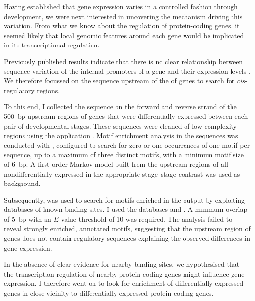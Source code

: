 Having established that \trna gene expression varies in a controlled fashion
through development, we were next interested in uncovering the mechanism driving
this variation. From what we know about the regulation of protein-coding genes,
it seemed likely that local genomic features around each \trna gene would be
implicated in its transcriptional regulation.

Previously published results indicate that there is no clear relationship
between sequence variation of the internal promoters of a \trna gene and their
expression levels \citep{Oler:2010,Canella:2012}. We therefore focussed on the
sequence upstream of the \tss of \trna genes to search for \emph{cis}-regulatory
regions.

To this end, I collected the sequence on the forward and reverse strand of the
\SI{500}{bp} upstream regions of \trna genes that were differentially expressed
between each pair of developmental stages. These sequences were cleaned of
low-complexity regions using the  application \citep{Bailey:2009}.
Motif enrichment analysis in the sequences was conducted with 
\citep{Bailey:2009}, configured to search for zero or one occurrences of one
motif per sequence, up to a maximum of three distinct motifs, with a minimum
motif size of \SI{6}{bp}. A first-order Markov model built from the upstream
regions of all nondifferentially expressed \trna[s] in the appropriate
stage–stage contrast was used as background.

Subsequently,  \citep{Gupta:2007} was used to search for motifs
enriched in the  output by exploiting databases of known \tf binding
sites. I used the databases  and
. A minimum overlap of \SI{5}{bp} with an
\(E\)-value threshold of \num{10} was required. The analysis failed to reveal
strongly enriched, annotated motifs, suggesting that the upstream region
of \trna genes does not contain regulatory sequences explaining the observed
differences in \trna gene expression.

In the absence of clear evidence for nearby \tf binding sites, we hypothesised
that the transcription regulation of nearby protein-coding genes might influence
\trna gene expression. I therefore went on to look for enrichment of
differentially expressed \trna genes in close vicinity to differentially
expressed protein-coding genes.

